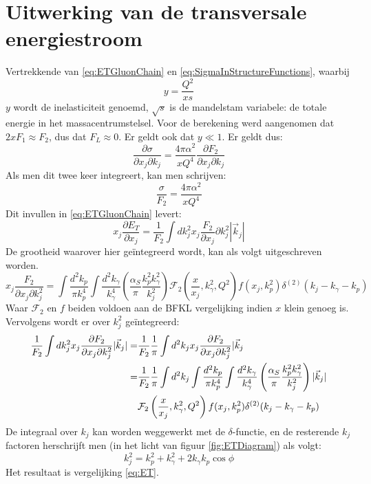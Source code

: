 \documentclass[a4paper,11pt]{article}
\numberwithin{equation}{section} %
\begin{document}
\section{Uitwerking van de transversale energiestroom} \label{app:ET}
Vertrekkende van \eqref{eq:ETGluonChain} en \eqref{eq:SigmaInStructureFunctions}, waarbij
\begin{equation}
y = \frac{Q^2}{xs}
\end{equation}
$y$ wordt de inelasticiteit genoemd, $\sqrt{s}$ is de mandelstam variabele: de totale energie in het massacentrumstelsel.
Voor de berekening werd aangenomen dat $2xF_1 \approx F_2$, dus dat $F_L \approx 0$.
Er geldt ook dat $y \ll 1$.
Er geldt dus:
\begin{equation}
\frac{\partial \sigma}{\partial x_j \partial k_j} = \frac{4\pi \alpha^2}{xQ^4} \frac{\partial F_2}{\partial x_j \partial k_j}
\end{equation}
Als men dit twee keer integreert, kan men schrijven:
\begin{equation}
\frac{\sigma}{F_2} = \frac{4\pi \alpha^2}{xQ^4}
\end{equation}
Dit invullen in \eqref{eq:ETGluonChain} levert:
\begin{equation}
x_j \frac{\partial E_T}{\partial x_j} = \frac{1}{F_2} \int dk_j^2 x_j \frac{F_2}{\partial x_j}{\partial k_j^2} |\vec{k}_j|
\end{equation}
De grootheid waarover hier geïntegreerd wordt, kan als volgt uitgeschreven worden.
\begin{equation}
x_j \frac{F_2}{\partial x_j \partial k_j^2} = \int \frac{d^2 k_p}{\pi k_p^4} \int \frac{d^2 k_\gamma}{k_\gamma^4} \left( \frac{\alpha_S}{\pi} \frac{k_p^2 k_\gamma^2}{k_j^2} \right) \mathcal{F}_2 \left( \frac{x}{x_j}, k_\gamma^2,Q^2 \right) f(x_j,k_p^2) \delta^{(2)}(k_j-k_\gamma-k_p)
\end{equation}
Waar $\mathcal{F}_2$ en $f$ beiden voldoen aan de BFKL vergelijking indien $x$ klein genoeg is.
Vervolgens wordt er over $k_j^2$ geïntegreerd:
\begin{align}
\frac{1}{F_2} \int dk_j^2 x_j \frac{\partial F_2}{\partial x_j \partial k_j^2} |\vec{k}_j| =& \frac{1}{F_2} \frac{1}{\pi} \int d^2 k_j x_j \frac{\partial F_2}{\partial x_j \partial k_j^2} |\vec{k}_j \notag \\
=& \frac{1}{F_2} \frac{1}{\pi} \int d^2 k_j \int \frac{d^2 k_p}{\pi k_p^4} \int \frac{d^2 k_\gamma}{k_\gamma^4} \left( \frac{\alpha_S}{\pi} \frac{k_p^2 k_\gamma^2}{k_j^2}  \right) |\vec{k}_j| \notag \\
&\mathcal{F}_2 \left( \frac{x}{x_j}, k_\gamma^2, Q^2 \right) f(x_j,k_p^2) \delta^{(2)}(k_j-k_\gamma-k_p)
\end{align}
De integraal over $k_j$ kan worden weggewerkt met de $\delta$-functie, en de resterende $k_j$ factoren herschrijft men (in het licht van figuur \ref{fig:ETDiagram}) als volgt:
\begin{equation}
k_j^2 = k_p^2 + k_\gamma^2 + 2 k_\gamma k_p \cos{\phi}
\end{equation}
Het resultaat is vergelijking \eqref{eq:ET}.
\end{document}
